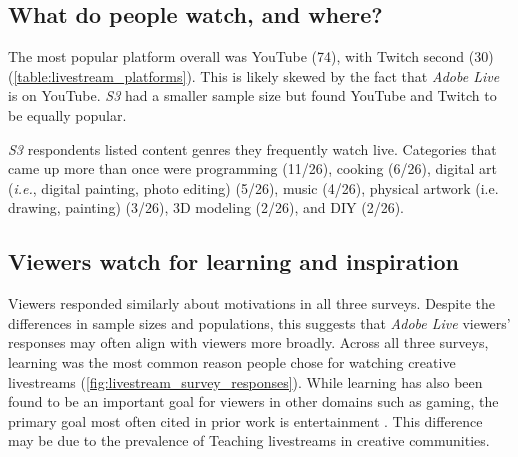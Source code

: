 \subsection{What do people watch, and where?}
The most popular platform overall was YouTube (74), with Twitch second (30) (\autoref{table:livestream_platforms}). This is likely skewed by the fact that \textit{Adobe Live} is on YouTube. \textit{S3} had a smaller sample size but found YouTube and Twitch to be equally popular.

\textit{S3} respondents listed content genres they frequently watch live. Categories that came up more than once were programming (11/26), cooking (6/26), digital art (\emph{i.e.}, digital painting, photo editing) (5/26), music (4/26), physical artwork (i.e. drawing, painting) (3/26), 3D modeling (2/26), and DIY (2/26).

\subsection{Viewers watch for learning and inspiration}
Viewers responded similarly about motivations in all three surveys. Despite the differences in sample sizes and populations, this suggests that \textit{Adobe Live} viewers' responses may often align with viewers more broadly. Across all three surveys, learning was the most common reason people chose for watching creative livestreams (\autoref{fig:livestream_survey_responses}). While learning has also been found to be an important goal for viewers in other domains such as gaming, the primary goal most often cited in prior work is entertainment \cite{Lu2019, Wohn2018, Lu2018a, Hilvert-Bruce2018, Faas2018, Cheung2011}.
This difference may be due to the prevalence of Teaching livestreams in creative communities.

